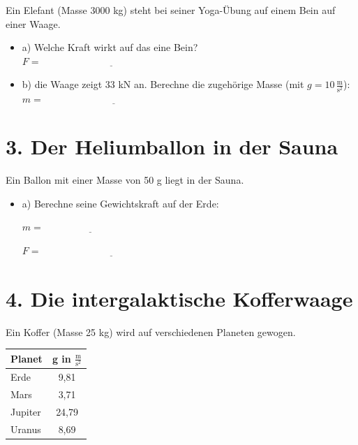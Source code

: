 \documentclass[a4paper,12pt]{article}
\begin{document}
	Ein Elefant (Masse 3000 kg) steht bei seiner Yoga-Übung auf einem Bein auf einer Waage.
	
	\begin{itemize}
		\item a) Welche Kraft wirkt auf das eine Bein?  
		\( F = \underline{\hspace{6cm}} \)
		
		\item b) die Waage zeigt 33 kN an. Berechne die zugehörige Masse (mit \( g = 10 \, \frac{\text{m}}{\text{s}^2} \)):  
		\( m = \underline{\hspace{6cm}} \)
	\end{itemize}
	
	\hrulefill
	
	\section*{3. Der Heliumballon in der Sauna }
	
	Ein Ballon mit einer Masse von 50 g liegt in der Sauna.
	
	\begin{itemize}
		\item a) Berechne seine Gewichtskraft auf der Erde:
		
		\vspace{1em}
		\( m = \underline{\hspace{4cm}} \)
		
		\( F = \underline{\hspace{6cm}} \)
	\end{itemize}
	
	\hrulefill
	
	\section*{4. Die intergalaktische Kofferwaage }
	
	Ein Koffer (Masse 25 kg) wird auf verschiedenen Planeten gewogen.
	
	\begin{center}
		\begin{tabular}{l c}
			\toprule
			\textbf{Planet} & \textbf{g in } \( \frac{\text{m}}{\text{s}^2} \) \\
			\midrule
			Erde & 9,81 \\
			Mars & 3,71 \\
			Jupiter & 24,79 \\
			Uranus & 8,69 \\
			\bottomrule
		\end{tabular}
	\end{center}
	
\end{document}
